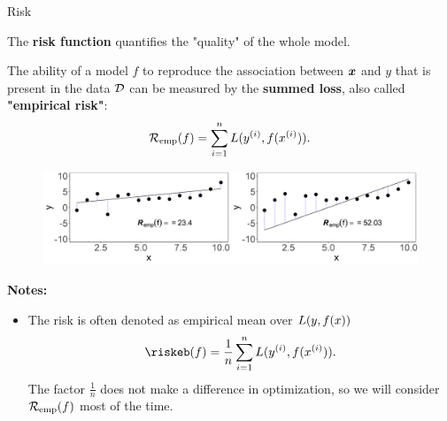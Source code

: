 \documentclass[11pt,compress,t,notes=noshow, xcolor=table]{beamer}
\begin{document}
\begin{vbframe}{Risk}

The \textbf{risk function} quantifies the "quality" of the whole model. 

\lz

The ability of a model $f$ to reproduce the association between $\bm{x}$ and $y$ that is present in the data $\mathcal{D}$ can be measured by the \textbf{summed loss}, also called \textbf{"empirical risk"}: \\

  $$
  \mathcal{R}_{\text{emp}}(f) = \sum_{i=1}^n L(y^{(i)}, f(x^{(i)})).
  $$  
        

\vfill

\begin{center}
\begin{figure}[!b]
\includegraphics[width=1\textwidth]{figure/ml-basic_riskmin-2-risk.png}
\end{figure}
\end{center}
   
\vspace*{0.1cm}   
   
\textbf{Notes:}
\begin{itemize}
\item The risk is often denoted as empirical mean over $L(y, f(x))$
  $$
    \riskeb(f) = \frac{1}{n}\sumin \Lxyi. 
  $$
  The factor $\frac{1}{n}$ does not make a difference in optimization, so we will consider $\mathcal{R}_{\text{emp}}(f)$ most of the time.  \end{itemize}
   
   
\end{vbframe}
\end{document}
